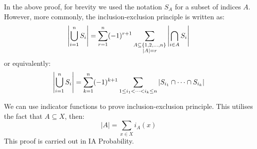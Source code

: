 \documentclass[../main.tex]{subfiles}
\begin{document}
In the above proof, for brevity we used the notation $S_A$ for a subset of indices $A$.
However, more commonly, the inclusion-exclusion principle is written as:
\[
  \left\lvert \bigcup_{i=1}^{n} S_i \right\rvert = \sum_{r=1}^{n} (-1)^{r+1} \sum_{\substack{A \subseteq \{1, 2, \ldots, n\}\\ |A| = r}} \left\lvert \bigcap_{i \in A}^{} S_i \right\rvert
\]
or equivalently:
\[
  \left\lvert \bigcup_{i=1}^{n} S_i \right\rvert = \sum_{k = 1}^{n} (-1)^{k + 1} \sum_{1 \leq i_1 < \cdots < i_k \leq n} |S_{i_1} \cap \cdots \cap S_{i_k}|
\]
\begin{remark}
  We can use indicator functions to prove inclusion-exclusion principle.
  This utilises the fact that $A \subseteq X$, then:
  \[
    |A| = \sum_{x \in X} i_A(x)
  \]
  This proof is carried out in IA Probability.
\end{remark}
\end{document}
